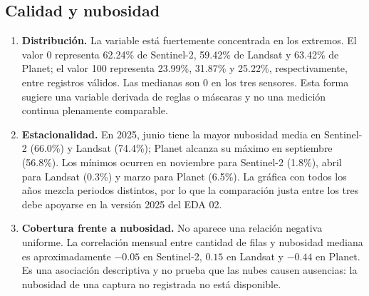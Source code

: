 ﻿\documentclass[11pt,a4paper]{article}
\begin{document}
\subsection{Calidad y nubosidad}
\begin{enumerate}[resume]
  \item \textbf{Distribución.} La variable está fuertemente concentrada en los
  extremos. El valor 0 representa 62.24\% de Sentinel-2, 59.42\% de Landsat y
  63.42\% de Planet; el valor 100 representa 23.99\%, 31.87\% y 25.22\%,
  respectivamente, entre registros válidos. Las medianas son 0 en los tres
  sensores. Esta forma sugiere una variable derivada de reglas o máscaras y no
  una medición continua plenamente comparable.

  \item \textbf{Estacionalidad.} En 2025, junio tiene la mayor nubosidad media
  en Sentinel-2 (66.0\%) y Landsat (74.4\%); Planet alcanza su máximo en
  septiembre (56.8\%). Los mínimos ocurren en noviembre para Sentinel-2
  (1.8\%), abril para Landsat (0.3\%) y marzo para Planet (6.5\%). La gráfica
  con todos los años mezcla periodos distintos, por lo que la comparación justa
  entre los tres debe apoyarse en la versión 2025 del EDA 02.

  \item \textbf{Cobertura frente a nubosidad.} No aparece una relación negativa
  uniforme. La correlación mensual entre cantidad de filas y nubosidad mediana
  es aproximadamente $-0.05$ en Sentinel-2, $0.15$ en Landsat y $-0.44$ en
  Planet. Es una asociación descriptiva y no prueba que las nubes causen
  ausencias: la nubosidad de una captura no registrada no está disponible.
\end{enumerate}
\end{document}
